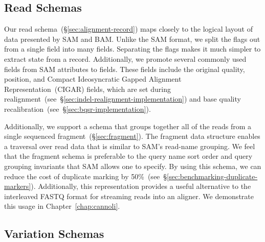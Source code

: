 \documentclass[phd]{ucbthesis}
\begin{document}
\subsection{Read Schemas}
\label{sec:read-schemas}

Our read schema~(\S\ref{sec:alignment-record}) maps closely to the logical layout of data presented by
{SAM} and {BAM}. Unlike the {SAM} format, we split the
flags out from a single field into many fields. Separating the flags makes it much simpler to
extract state from a record. Additionally, we promote several commonly used
fields from {SAM} attributes to fields. These fields include the original
quality, position, and Compact Ideosyncratic Gapped Alignment Representation~(CIGAR) fields, which are set during
realignment~(see~\S\ref{sec:indel-realignment-implementation}) and base quality
recalibration~(see~\S\ref{sec:bqsr-implementation}).

Additionally, we support a schema that groups together all of the reads from a
single sequenced fragment~(\S\ref{sec:fragment}). The fragment data structure enables a traversal over read data that
is similar to {SAM}'s read-name grouping.
We feel that the fragment schema is preferable to the query name sort order and
query grouping invariants that {SAM} allows one to specify. By using this
schema, we can reduce the cost of duplicate marking by
50\%~(see~\S\ref{sec:benchmarking-duplicate-markers}). Additionally, this
representation provides a useful alternative to the interleaved FASTQ format for
streaming reads into an aligner. We demonstrate this usage in
Chapter~\ref{chap:cannoli}.

\subsection{Variation Schemas}
\label{sec:variation-schemas}
\end{document}
